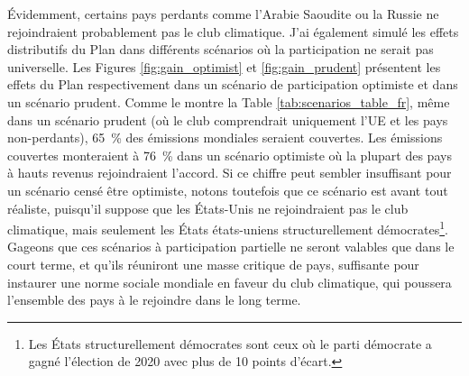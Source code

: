 \documentclass[a5paper,french]{memoir}
\begin{document}
Évidemment, certains pays perdants comme l'Arabie Saoudite ou la Russie ne rejoindraient probablement pas le club climatique. J'ai également simulé les effets distributifs du Plan dans différents scénarios où la participation ne serait pas universelle. Les Figures \ref{fig:gain_optimist} et \ref{fig:gain_prudent} présentent les effets du Plan respectivement dans un scénario de participation optimiste et dans un scénario prudent. Comme le montre la Table \ref{tab:scenarios_table_fr}, même dans un scénario prudent (où le club comprendrait uniquement l'UE et les pays non-perdants), 65~\% des émissions mondiales seraient couvertes. Les émissions couvertes monteraient à 76~\% dans un scénario optimiste où la plupart des pays à hauts revenus rejoindraient l'accord. Si ce chiffre peut sembler insuffisant pour un scénario censé être optimiste, notons toutefois que ce scénario est avant tout réaliste, puisqu'il suppose que les États-Unis ne rejoindraient pas le club climatique, mais seulement les États états-uniens structurellement démocrates\footnote{Les États structurellement démocrates sont ceux où le parti démocrate a gagné l'élection de 2020 avec plus de 10 points d'écart.}. Gageons que ces scénarios à participation partielle ne seront valables que dans le court terme, et qu'ils réuniront une masse critique de pays, suffisante pour instaurer une norme sociale mondiale en faveur du club climatique, qui poussera l'ensemble des pays à le rejoindre dans le long terme.
\end{document}
